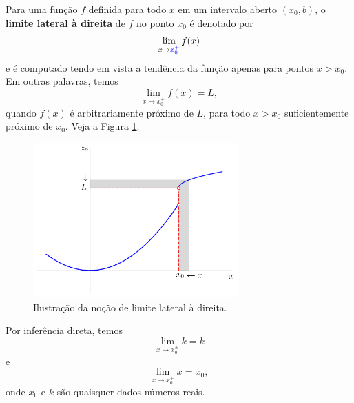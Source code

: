 Para uma função $f$ definida para todo $x$ em um intervalo aberto $(x_0, b)$, o {\bf limite lateral à direita} de $f$ no ponto $x_0$ é denotado por
\begin{equation}
  \lim_{x\to {\color{blue}x_0^+}} f(x)
\end{equation}
e é computado tendo em vista a tendência da função apenas para pontos $x>x_0$. Em outras palavras, temos
\begin{equation}
  \lim_{x\to x_0^+} f(x) = L,
\end{equation}
quando $f(x)$ é arbitrariamente próximo de $L$, para todo $x>x_0$ suficientemente próximo de $x_0$. Veja a Figura \ref{fig:lim_dir}.

\begin{figure}[H]
  \centering
  \includegraphics[width=0.7\textwidth]{./cap_lim/dados/fig_lim_dir/fig_lim_dir}
  \caption{Ilustração da noção de limite lateral à direita.}
  \label{fig:lim_dir}
\end{figure}

\begin{obs}
  Por inferência direta, temos
  \begin{equation}
    \lim_{x\to x_0^{\pm}} k = k
  \end{equation}
  e
  \begin{equation}
    \lim_{x\to x_0^{\pm}} x = x_0,
  \end{equation}
  onde $x_0$ e $k$ são quaisquer dados números reais.
\end{obs}

